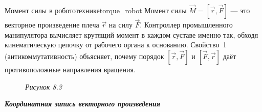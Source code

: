 \documentclass[12pt,a4paper]{article}
\newcommand{\va}{\bar{a}}
\newcommand{\vb}{\bar{b}}
\newcommand{\vc}{\bar{c}}
\begin{document}
\begin{remarkIT}{Момент силы в робототехнике}{torque_robot}
  Момент силы $\vec{M} = [\vec{r}, \vec{F}]$ --- это векторное
  произведение плеча $\vec{r}$ на силу $\vec{F}$. Контроллер
  промышленного манипулятора вычисляет крутящий момент в каждом
  суставе именно так, обходя кинематическую цепочку от рабочего
  органа к основанию. Свойство~1 (антикоммутативность) объясняет,
  почему порядок $[\vec{r},\vec{F}]$ и $[\vec{F},\vec{r}]$ даёт
  противоположные направления вращения.
\end{remarkIT}

\begin{figure}[h]
  \centering

  \smallskip
  \textit{Рисунок 8.3}
\end{figure}

\textbf{\textit{Координатная запись векторного произведения}}
\end{document}
